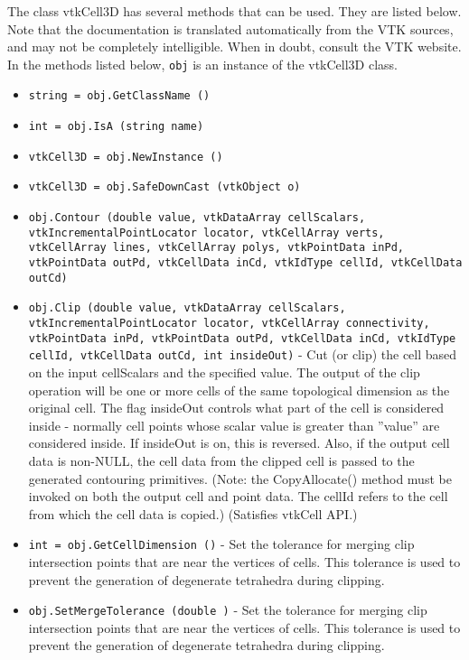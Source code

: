The class vtkCell3D has several methods that can be used.
  They are listed below.
Note that the documentation is translated automatically from the VTK sources,
and may not be completely intelligible.  When in doubt, consult the VTK website.
In the methods listed below, \verb|obj| is an instance of the vtkCell3D class.
\begin{itemize}
\item  \verb|string = obj.GetClassName ()|

\item  \verb|int = obj.IsA (string name)|

\item  \verb|vtkCell3D = obj.NewInstance ()|

\item  \verb|vtkCell3D = obj.SafeDownCast (vtkObject o)|

\item  \verb|obj.Contour (double value, vtkDataArray cellScalars, vtkIncrementalPointLocator locator, vtkCellArray verts, vtkCellArray lines, vtkCellArray polys, vtkPointData inPd, vtkPointData outPd, vtkCellData inCd, vtkIdType cellId, vtkCellData outCd)|

\item  \verb|obj.Clip (double value, vtkDataArray cellScalars, vtkIncrementalPointLocator locator, vtkCellArray connectivity, vtkPointData inPd, vtkPointData outPd, vtkCellData inCd, vtkIdType cellId, vtkCellData outCd, int insideOut)| -  Cut (or clip) the cell based on the input cellScalars and the specified
 value. The output of the clip operation will be one or more cells of the
 same topological dimension as the original cell.  The flag insideOut
 controls what part of the cell is considered inside - normally cell
 points whose scalar value is greater than ''value'' are considered
 inside. If insideOut is on, this is reversed. Also, if the output cell
 data is non-NULL, the cell data from the clipped cell is passed to the
 generated contouring primitives. (Note: the CopyAllocate() method must
 be invoked on both the output cell and point data. The cellId refers to
 the cell from which the cell data is copied.)  (Satisfies vtkCell API.)

\item  \verb|int = obj.GetCellDimension ()| -  Set the tolerance for merging clip intersection points that are near
 the vertices of cells. This tolerance is used to prevent the generation
 of degenerate tetrahedra during clipping.

\item  \verb|obj.SetMergeTolerance (double )| -  Set the tolerance for merging clip intersection points that are near
 the vertices of cells. This tolerance is used to prevent the generation
 of degenerate tetrahedra during clipping.


\end{itemize}

